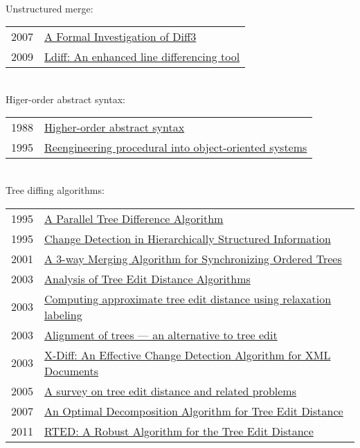 \documentclass[12pt]{article}
\begin{document}
\\
Unstructured merge: \\
\begin{tabular}{ | l | l | }
	2007 & \href{http://www.cis.upenn.edu/~bcpierce/papers/diff3-short.pdf}{A Formal Investigation of Diff3 } \\
	2009 & \href{http://ieeexplore.ieee.org/xpl/articleDetails.jsp?tp=&arnumber=5070564}{Ldiff: An enhanced line differencing tool } \\
\end{tabular}
\\
Higer-order abstract syntax: \\
\begin{tabular}{ | l | l | }
	1988 & \href{http://dl.acm.org/citation.cfm?id=54010}{Higher-order abstract syntax} \\
	1995 & \href{http://ieeexplore.ieee.org/xpls/abs_all.jsp?arnumber=514712&tag=1}{Reengineering procedural into object-oriented systems} \\	
\end{tabular}
\\
Tree diffing algorithms: \\
\begin{tabular}{ | l | l | }
	1995 & \href{http://citeseerx.ist.psu.edu/viewdoc/summary?doi=10.1.1.48.8675}{A Parallel Tree Difference Algorithm } \\
	1995 & \href{http://ilpubs.stanford.edu:8090/115/1/1995-46.pdf}{Change Detection in Hierarchically Structured Information} \\
	2001 & \href{http://tdm.berlios.de/3dm/doc/thesis.pdf}{A 3-way Merging Algorithm for Synchronizing Ordered Trees} \\
	2003 & \href{http://www.lifl.fr/~touzet/Publications/cpm03.pdf}{Analysis of Tree Edit Distance Algorithms} \\
	2003 & \href{http://www.sciencedirect.com/science/article/pii/S0167865502002556}{Computing approximate tree edit distance using relaxation labeling} \\
	2003 & \href{http://www.sciencedirect.com/science/article/pii/0304397595800299}{Alignment of trees — an alternative to tree edit} \\
	2003 & \href{http://ieeexplore.ieee.org/xpls/abs_all.jsp?arnumber=1260818}{X-Diff: An Effective Change Detection Algorithm for XML Documents} \\
	2005 & \href{http://citeseerx.ist.psu.edu/viewdoc/summary?doi=10.1.1.100.2577}{A survey on tree edit distance and related problems } \\
	2007 & \href{http://link.springer.com/chapter/10.1007\%2F978-3-540-73420-8_15?LI=true}{An Optimal Decomposition Algorithm for Tree Edit Distance}  \\ %
	2011 & \href{http://arxiv.org/abs/1201.0230}{RTED: A Robust Algorithm for the Tree Edit Distance}
\end{tabular}
\end{document}

